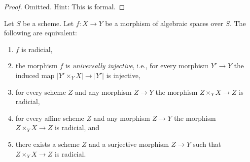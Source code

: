 \begin{proof}
Omitted. Hint: This is formal.
\end{proof}

\begin{lemma}
\label{lemma-radicial-local}
Let $S$ be a scheme.
Let $f : X \to Y$ be a morphism of algebraic spaces over $S$.
The following are equivalent:
\begin{enumerate}
\item $f$ is radicial,
\item the morphism $f$ is {\it universally injective}, i.e.,
for every morphism $Y' \to Y$ the induced map $|Y' \times_Y X| \to |Y'|$
is injective,
\item for every scheme $Z$ and any morphism $Z \to Y$ the morphism
$Z \times_Y X \to Z$ is radicial,
\item for every affine scheme $Z$ and any morphism
$Z \to Y$ the morphism $Z \times_Y X \to Z$ is radicial, and
\item there exists a scheme $Z$ and a surjective morphism
$Z \to Y$ such that $Z \times_Y X \to Z$ is radicial.
\end{enumerate}
\end{lemma}

